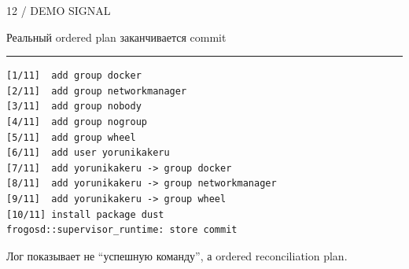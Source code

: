 \documentclass[aspectratio=169,10pt]{beamer}
\newcommand{\kicker}[1]{\textcolor{Muted}{\footnotesize\MakeUppercase{#1}}}
\newcommand{\slidehead}[2]{
  \vspace*{0.2cm}
  \kicker{#1}\par
  \vspace{0.1cm}
  {\usebeamerfont{frametitle}\textcolor{Text}{#2}}\par
  \vspace{0.18cm}
  {\color{Muted}\rule{\linewidth}{0.4pt}}
  \vspace{0.25cm}
}
\newcommand{\muted}[1]{\textcolor{Muted}{#1}}
\begin{document}
\begin{frame}[fragile]{}
  \slidehead{12 / demo signal}{Реальный ordered plan заканчивается commit}

  \begin{verbatim}
[1/11]  add group docker
[2/11]  add group networkmanager
[3/11]  add group nobody
[4/11]  add group nogroup
[5/11]  add group wheel
[6/11]  add user yorunikakeru
[7/11]  add yorunikakeru -> group docker
[8/11]  add yorunikakeru -> group networkmanager
[9/11]  add yorunikakeru -> group wheel
[10/11] install package dust
frogosd::supervisor_runtime: store commit
  \end{verbatim}

  \vspace{0.08cm}
  \muted{Лог показывает не “успешную команду”, а ordered reconciliation plan.}
\end{frame}
\end{document}
